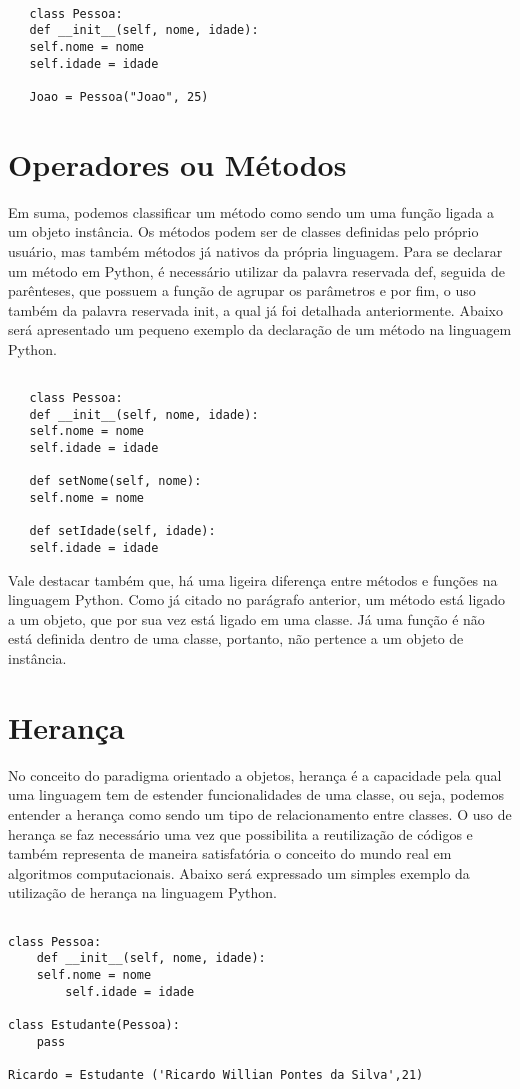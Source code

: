    \begin{lstlisting} 
   	  	
   class Pessoa:
   def __init__(self, nome, idade):
   self.nome = nome
   self.idade = idade
   
   Joao = Pessoa("Joao", 25)
\end{lstlisting}

    \section{Operadores ou M\'{e}todos}
Em suma, podemos classificar um método como sendo um uma função ligada a um objeto instância. Os métodos podem ser de classes definidas pelo próprio usuário, mas também métodos já nativos da própria linguagem. Para se declarar um método em Python, é necessário utilizar da palavra reservada def, seguida de parênteses, que possuem a função de agrupar os parâmetros e por fim, o uso também da palavra reservada init, a qual já foi detalhada anteriormente. Abaixo será apresentado um pequeno exemplo da declaração de um método na linguagem Python.
 
   \begin{lstlisting} 
	
   class Pessoa:
   def __init__(self, nome, idade):
   self.nome = nome
   self.idade = idade

   def setNome(self, nome):
   self.nome = nome

   def setIdade(self, idade):
   self.idade = idade

\end{lstlisting}


Vale destacar também que, há uma ligeira diferença entre métodos e funções na linguagem Python. Como já citado no parágrafo anterior, um método está ligado a um objeto, que por sua vez está ligado em uma classe. Já uma função é não está definida dentro de uma classe, portanto, não pertence a um objeto de instância.
    \section{Heran\c{c}a}
No conceito do paradigma orientado a objetos, herança é a capacidade pela qual uma linguagem tem de estender funcionalidades de uma classe, ou seja, podemos entender a herança como sendo um tipo de relacionamento entre classes. O uso de herança se faz necessário uma vez que possibilita a reutilização de códigos e também representa de maneira satisfatória o conceito do mundo real em algoritmos computacionais. Abaixo será expressado um simples exemplo da utilização de herança na linguagem Python.
   \begin{lstlisting} 	

class Pessoa:
	def __init__(self, nome, idade):
	self.nome = nome
		self.idade = idade

class Estudante(Pessoa):
	pass

Ricardo = Estudante ('Ricardo Willian Pontes da Silva',21)
\end{lstlisting}

